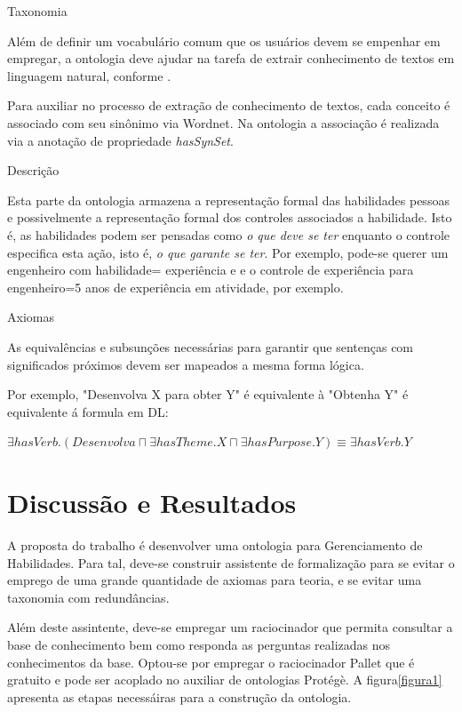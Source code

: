 \documentclass[hyphens,11pt,a4paper]{article}
\newcommand{\dland}{\sqcap}         %
\begin{document}
\begin{description}
\item Taxonomia 

Além de definir um vocabulário comum que os usuários devem se empenhar em empregar, a ontologia deve ajudar na tarefa de extrair conhecimento de textos em linguagem natural, conforme \cite{Aussenac-Gilles:2005:TAO:1412350.1412354}.

Para auxiliar no processo de extração de conhecimento de textos, cada conceito é associado com seu sinônimo via Wordnet. Na ontologia a associação é realizada via a anotação de propriedade \emph{hasSynSet}.

\item Descrição

Esta parte da ontologia armazena a representação formal das habilidades pessoas e possivelmente a representação formal dos controles associados a habilidade. Isto é, as habilidades podem ser pensadas como \emph{o que deve se ter} enquanto o controle especifica esta ação, isto é, \emph{o que garante se ter}. Por exemplo, pode-se querer um engenheiro com habilidade= experiência e e o controle de experiência para engenheiro=5 anos de experiência em atividade, por exemplo.

\item Axiomas

As equivalências e subsunções necessárias para garantir que sentenças com significados próximos devem ser mapeados a mesma forma lógica.

Por  exemplo,  "Desenvolva X para obter Y" é equivalente à "Obtenha Y" é equivalente á formula em DL:

$\exists hasVerb.(Desenvolva \dland \exists hasTheme.X\dland \exists hasPurpose.Y)\equiv \exists hasVerb.Y$

\end{description}


\section{Discussão e Resultados}
A proposta do trabalho é desenvolver uma ontologia para Gerenciamento de Habilidades. Para tal, deve-se construir assistente de formalização para se evitar o emprego de uma grande quantidade de axiomas para teoria, e se evitar uma taxonomia com redundâncias. 

Além deste assintente, deve-se empregar um raciocinador que permita consultar a base de conhecimento bem como  responda as perguntas realizadas nos conhecimentos da base. Optou-se por empregar o raciocinador Pallet que é gratuito e pode ser acoplado no auxiliar de ontologias Protégè. A figura\ref{figura1} apresenta as etapas necessáiras para a construção da ontologia. 
\end{document}
